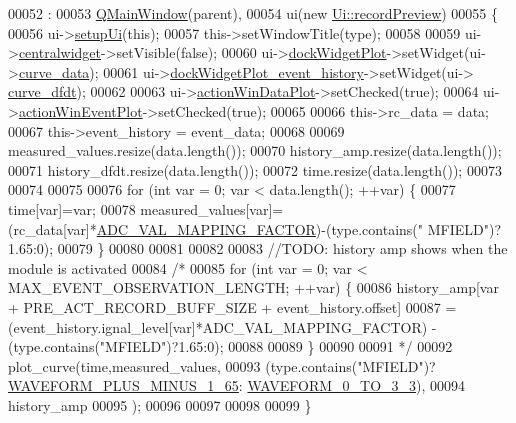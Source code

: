 \begin{DoxyCode}
00052                                                                                                         :
00053     \hyperlink{a00010}{QMainWindow}(parent),
00054     ui(\textcolor{keyword}{new} \hyperlink{a00021}{Ui::recordPreview})
00055 \{
00056     ui->\hyperlink{a00028_afa41dc070a896a5eae476f3c0206825c}{setupUi}(\textcolor{keyword}{this});
00057     this->setWindowTitle(type);
00058 
00059     ui->\hyperlink{a00028_ac9ab4609922159e8e4cc45905f76928e}{centralwidget}->setVisible(\textcolor{keyword}{false});
00060     ui->\hyperlink{a00028_a07b76f17803ec09e0367b72938bbd097}{dockWidgetPlot}->setWidget(ui->\hyperlink{a00028_a247d94481323c0bc4f8b6458a8a535dd}{curve\_data});
00061     ui->\hyperlink{a00028_a2a8f7ee8d4458dd20481c8a1c29ce185}{dockWidgetPlot\_event\_history}->setWidget(ui->
      \hyperlink{a00028_a43d24fa14d90cc27b310542e39dcdd1b}{curve\_dfdt});
00062 
00063     ui->\hyperlink{a00028_aa09067a9c96c9cd78f75261a9fcb89f0}{actionWinDataPlot}->setChecked(\textcolor{keyword}{true});
00064     ui->\hyperlink{a00028_ac72ec9c8679d46fd43a87f99ee6db893}{actionWinEventPlot}->setChecked(\textcolor{keyword}{true});
00065 
00066     this->rc\_data       = data;
00067     this->event\_history  = event\_data;
00068 
00069     measured\_values.resize(data.length());
00070     history\_amp.resize(data.length());
00071     history\_dfdt.resize(data.length());
00072     time.resize(data.length());
00073 
00074 
00075 
00076     \textcolor{keywordflow}{for} (\textcolor{keywordtype}{int} var = 0; var < data.length(); ++var) \{
00077         time[var]=var;
00078         measured\_values[var]=(rc\_data[var]*\hyperlink{a00031_ada92d3eeeec0cbeee41e76a52d145792}{ADC\_VAL\_MAPPING\_FACTOR})-(type.contains(\textcolor{stringliteral}{"
      MFIELD"})?1.65:0);
00079     \}
00080 
00081 
00082 
00083     \textcolor{comment}{//TODO: history amp shows when the module is activated}
00084     \textcolor{comment}{/*}
00085 \textcolor{comment}{    for (int var = 0; var < MAX\_EVENT\_OBSERVATION\_LENGTH; ++var) \{}
00086 \textcolor{comment}{        history\_amp[var + PRE\_ACT\_RECORD\_BUFF\_SIZE + event\_history.offset]}
00087 \textcolor{comment}{                =(event\_history.ignal\_level[var]*ADC\_VAL\_MAPPING\_FACTOR) -
       (type.contains("MFIELD")?1.65:0);}
00088 \textcolor{comment}{}
00089 \textcolor{comment}{    \}}
00090 \textcolor{comment}{}
00091 \textcolor{comment}{    */}
00092     plot\_curve(time,measured\_values,
00093               (type.contains(\textcolor{stringliteral}{"MFIELD"})?\hyperlink{a00034_a0923d3b365a36e1e8c401cec964aa36f}{WAVEFORM\_PLUS\_MINUS\_1\_65}:
      \hyperlink{a00034_ae18fed2471b16a8516d721ff60671dd9}{WAVEFORM\_0\_TO\_3\_3}),
00094               history\_amp
00095               );
00096 
00097 
00098 
00099 \}
\end{DoxyCode}


